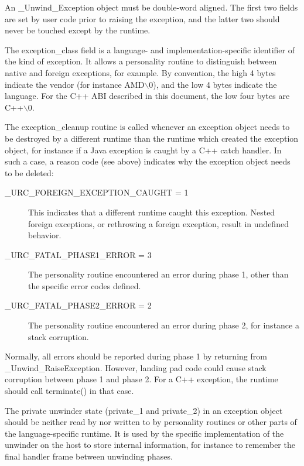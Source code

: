 An \_Unwind\_Exception object must be double-word aligned.  The first
two fields are set by user code prior to raising the exception, and the
latter two should never be touched except by the runtime.

The exception\_class field is a language- and implementation-specific
identifier of the kind of exception. It allows a personality routine
to distinguish between native and foreign exceptions, for example.
By convention, the high 4 bytes indicate the vendor (for instance
AMD$\backslash$0), and the low 4 bytes indicate the language.  For the C++
ABI described in this document, the low four bytes are C++$\backslash$0.

The exception\_cleanup routine is called whenever an exception object 
needs to be destroyed by a different runtime than the runtime
which created the exception object, for instance if a Java exception 
is caught by a C++ catch handler. In such a case, a reason code (see
above) indicates why the exception object needs to be deleted: 

\begin{description}
\item[\_URC\_FOREIGN\_EXCEPTION\_CAUGHT = 1] This indicates that a 
     different runtime caught this exception. Nested foreign exceptions, 
     or rethrowing a foreign exception, result in undefined behavior. 

\item[\_URC\_FATAL\_PHASE1\_ERROR = 3] The personality routine encountered 
     an error during phase 1, other than the specific error codes defined. 

\item[\_URC\_FATAL\_PHASE2\_ERROR = 2] The personality routine encountered 
     an error during phase 2, for instance a stack corruption.
\end{description}

Normally, all errors should be reported during phase 1 by returning 
from \_Unwind\_RaiseException. However, landing pad code could cause 
stack corruption between phase 1 and phase 2. For a C++ exception, 
the runtime should call terminate() in that case. 

The private unwinder state (private\_1 and private\_2) in an exception
object should be neither read by nor written to by personality routines or
other parts of the language-specific runtime.  It is used by the specific
implementation of the unwinder on the host to store internal information,
for instance to remember the final handler frame between unwinding phases.

